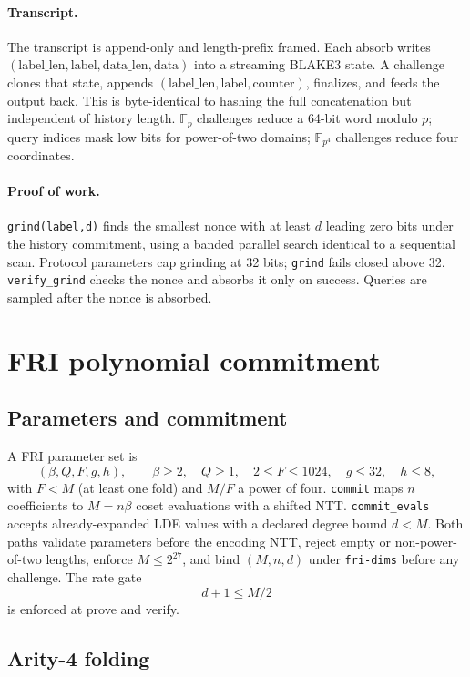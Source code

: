 \documentclass[11pt,a4paper]{article}
\newcommand{\zFp}{\mathbb{F}_p}
\newcommand{\zFpFour}{\mathbb{F}_{p^4}}
\begin{document}
\paragraph{Transcript.} The transcript is append-only and length-prefix
framed. Each absorb writes
$(\text{label\_len},\text{label},\text{data\_len},\text{data})$ into a
streaming BLAKE3 state. A challenge clones that state, appends
$(\text{label\_len},\text{label},\text{counter})$, finalizes, and feeds the
output back. This is byte-identical to hashing the full concatenation but
independent of history length. $\zFp$ challenges reduce a 64-bit word modulo
$p$; query indices mask low bits for power-of-two domains; $\zFpFour$ challenges
reduce four coordinates.

\paragraph{Proof of work.} \texttt{grind(label,d)} finds the smallest nonce
with at least $d$ leading zero bits under the history commitment, using a
banded parallel search identical to a sequential scan. Protocol parameters
cap grinding at 32 bits; \texttt{grind} fails closed above 32.
\texttt{verify\_grind} checks the nonce and absorbs it only on success.
Queries are sampled after the nonce is absorbed.

\section{FRI polynomial commitment}

\subsection{Parameters and commitment}

A FRI parameter set is
\[
(\beta,Q,F,g,h),\qquad
\beta\ge 2,\quad Q\ge 1,\quad 2\le F\le 1024,\quad g\le 32,\quad h\le 8,
\]
with $F<M$ (at least one fold) and $M/F$ a power of four. \texttt{commit}
maps $n$ coefficients to $M=n\beta$ coset evaluations with a shifted NTT.
\texttt{commit\_evals} accepts already-expanded LDE values with a declared
degree bound $d<M$. Both paths validate parameters before the encoding NTT,
reject empty or non-power-of-two lengths, enforce $M\le 2^{27}$, and bind
$(M,n,d)$ under \texttt{fri-dims} before any challenge. The rate gate
\[
d+1\le M/2
\]
is enforced at prove and verify.

\subsection{Arity-4 folding}
\end{document}
